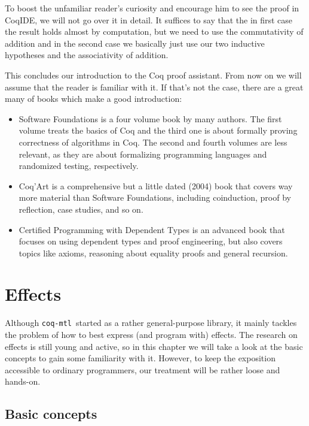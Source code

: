 \documentclass[declaration,inz,english,shortabstract]{iithesis}
\newcommand{\libname}{\m{coq-mtl}}
\newcommand{\m}[1]{\texttt{#1}}
\begin{document}
To boost the unfamiliar reader's curiosity and encourage him to see the proof in CoqIDE, we will not go over it in detail. It suffices to say that the in first case the result holds almost by computation, but we need to use the commutativity of addition and in the second case we basically just use our two inductive hypotheses and the associativity of addition.

This concludes our introduction to the Coq proof assistant. From now on we will assume that the reader is familiar with it. If that's not the case, there are a great many of books which make a good introduction:

\begin{itemize}
    \item Software Foundations \cite{SoftwareFoundations} is a four volume book by many authors. The first volume treats the basics of Coq and the third one is about formally proving correctness of algorithms in Coq. The second and fourth volumes are less relevant, as they are about formalizing programming languages and randomized testing, respectively.
    \item Coq'Art \cite{CoqArt} is a comprehensive but a little dated (2004) book that covers way more material than Software Foundations, including coinduction, proof by reflection, case studies, and so on.
    \item Certified Programming with Dependent Types \cite{CPDT} is an advanced book that focuses on using dependent types and proof engineering, but also covers topics like axioms, reasoning about equality proofs and general recursion.
\end{itemize}

\chapter{Effects} \label{ch2}

Although \libname\ started as a rather general-purpose library, it mainly tackles the problem of how to best express (and program with) effects. The research on effects is still young and active, so in this chapter we will take a look at the basic concepts to gain some familiarity with it. However, to keep the exposition accessible to ordinary programmers, our treatment will be rather loose and hands-on.

\section{Basic concepts}
\end{document}
